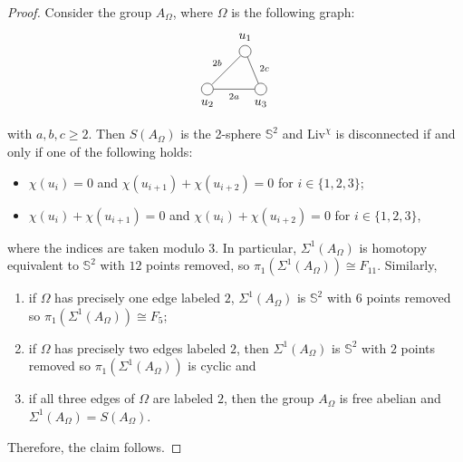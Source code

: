 \documentclass[10pt,a4paper]{amsart}
\begin{document}
\begin{proof}
Consider the group $A_\Omega$, where $\Omega$ is the following graph:
$$\begin{tikzpicture}[main/.style = {draw, circle},node distance={15mm}] 
    \node[label=below:{$u_2$}][main] (1)  {}; 
    \node[label={$u_1$}][main] (6) [above right of=1] {};
    \node[label=below:{$u_3$}][main] (2) [right of=1] {}; 
    
    \draw[-] (1) -- node[below] {$\scriptstyle{2a}$}  (2);
    \draw[-] (1) -- node[above left]{$\scriptstyle{2b}$}  (6);
    \draw[-] (6) -- node[pos=0.7,above right] {$\scriptstyle{2c}$}   (2);
\end{tikzpicture}$$
with $a,b,c\geq 2$. Then $S(A_\Omega)$ is the 2-sphere $\mathbb{S}^2$ and
$\mathrm{Liv}^\chi$ is disconnected if and only if one of the following holds:
\begin{itemize}
    \item $\chi(u_i)=0$ and $\chi(u_{i+1})+\chi(u_{i+2})=0$ for $i\in\{1,2,3\}$;
    \item $\chi(u_i)+\chi(u_{i+1})=0$ and $\chi(u_i)+\chi(u_{i+2})=0$ for $i\in\{1,2,3\}$,
\end{itemize}
where the indices are taken modulo $3$. In particular, $\Sigma^1(A_\Omega)$ is homotopy equivalent to $\mathbb{S}^2$ with $12$ points removed, so $\pi_1(\Sigma^1(A_\Omega))\cong F_{11}$. Similarly,  
\begin{enumerate}
    \item if $\Omega$ has precisely one edge labeled $2$, $\Sigma^1(A_\Omega)$ is $\mathbb{S}^2$ with $6$ points removed so $\pi_1(\Sigma^1(A_\Omega))\cong F_5$;

    \item  if $\Omega$ has precisely two edges labeled $2$, then $\Sigma^1(A_\Omega)$ is $\mathbb{S}^2$ with $2$ points removed so $\pi_1(\Sigma^1(A_\Omega))$ is cyclic and
    
   \item if all three edges of $\Omega$ are labeled $2$, then the group $A_\Omega$ is free abelian and  $\Sigma^1(A_\Omega)=S(A_\Omega)$.
\end{enumerate}
Therefore, the claim follows.
\end{proof}
\end{document}

